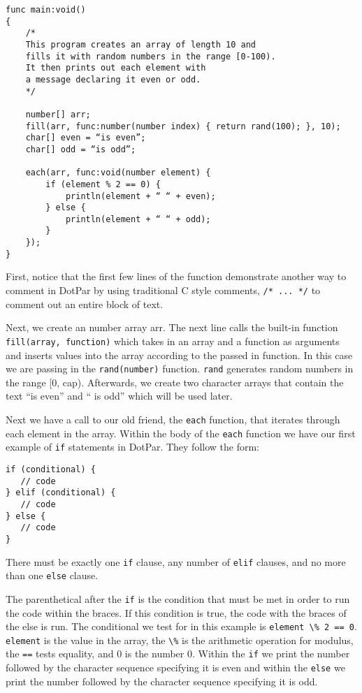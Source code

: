\documentclass{article}
\begin{document}
\begin{verbatim}
func main:void()
{
    /*
    This program creates an array of length 10 and 
    fills it with random numbers in the range [0-100).
    It then prints out each element with 
    a message declaring it even or odd.  
    */

    number[] arr;
    fill(arr, func:number(number index) { return rand(100); }, 10);
    char[] even = “is even”;
    char[] odd = “is odd”;

    each(arr, func:void(number element) {
        if (element % 2 == 0) {
            println(element + “ “ + even);
        } else {
            println(element + “ “ + odd);
        }
    });
}
\end{verbatim}

First, notice that the first few lines of the function demonstrate another way to comment in DotPar by using traditional C style comments, \verb!/* ... */! to comment out an entire block of text.

Next, we create an number array arr. The next line calls the built-in function \verb!fill(array, function)! which takes in an array and a function as arguments and inserts values into the array according to the passed in function. In this case we are passing in the \verb!rand(number)! function. \verb!rand! generates random numbers in the range [0, cap). Afterwards, we create two character arrays that contain the text ``is even'' and `` is odd'' which will be used later.

Next we have a call to our old friend, the \verb!each! function, that iterates through each element in the array. Within the body of the \verb!each! function we have our first example of \verb!if! statements in DotPar. They follow the form: 

\begin{verbatim}
if (conditional) {
   // code
} elif (conditional) {
   // code
} else {
   // code
}
\end{verbatim}

There must be exactly one \verb!if! clause, any number of \verb!elif! clauses, and no more than one \verb!else! clause.

The parenthetical after the \verb!if! is the condition that must be met in order to run the code within the braces. If this condition is true, the code with the braces of the else is run. The conditional we test for in this example is \verb!element \% 2 == 0!. \verb!element! is the value in the array, the \verb!\%! is the arithmetic operation for modulus, the \verb!==! tests equality, and 0 is the number 0. Within the \verb!if! we print the number followed by the character sequence specifying it is even and within the \verb!else! we print the number followed by the character sequence specifying it is odd.
\end{document}
